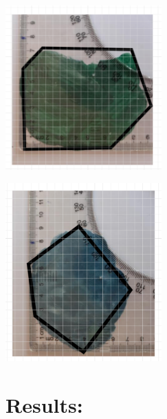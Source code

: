 \documentclass[a4paper]{article}
\begin{document}
\begin{center}
    \begin{minipage}{0.48\textwidth}
        \includegraphics[width=6cm]{Image_3_plot}
    \end{minipage}
    \hfill
    \begin{minipage}{0.48\textwidth}
        \includegraphics[width=6cm]{Image_4_plot}
    \end{minipage}
\end{center}


\section{Results: }
\end{document}
